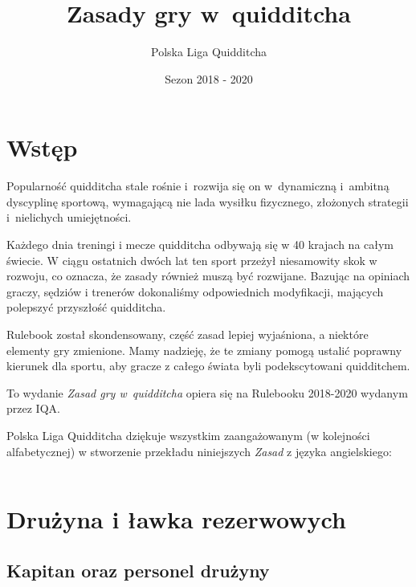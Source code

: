 \documentclass[11pt,a4paper]{article}
\title{Zasady gry w~quidditcha}
\author{Polska Liga Quidditcha}
\date{Sezon 2018 - 2020}
\newcommand{\psection}[1]{
  \section*{#1}
  \addcontentsline{toc}{section}{#1}
}
\newcommand\image[2]{
	\newgeometry{left=0cm,top=#2}
	\texttt{[image: \#1]}
	\restoregeometry
}
\begin{document}
\maketitle

\setlength{\parskip}{0ex}

\pagestyle{fancy}

\tableofcontents

\setlength{\parskip}{1ex plus 0.5ex minus 0.2ex}

\newpage

\psection{Wstęp}

Popularność quidditcha stale rośnie i~rozwija się on w~dynamiczną i~ambitną dyscyplinę sportową,
wymagającą nie lada wysiłku fizycznego,
złożonych strategii i~nielichych umiejętności.

Każdego dnia treningi i mecze quidditcha odbywają się w 40 krajach na całym świecie.
W ciągu ostatnich dwóch lat ten sport przeżył niesamowity skok w rozwoju, co oznacza,
że zasady również muszą być rozwijane. Bazując na opiniach graczy, sędziów i trenerów
dokonaliśmy odpowiednich modyfikacji, mających polepszyć przyszłość quidditcha.

Rulebook został skondensowany, część zasad lepiej wyjaśniona, a niektóre elementy gry
zmienione. Mamy nadzieję, że te zmiany pomogą ustalić poprawny kierunek dla sportu, aby gracze
z całego świata byli podekscytowani quidditchem.

To wydanie \emph{Zasad gry w~quidditcha} opiera się na Rulebooku 2018-2020 wydanym przez IQA.

Polska Liga Quidditcha dziękuje wszystkim zaangażowanym (w kolejności alfabetycznej) w stworzenie przekładu niniejszych \emph{Zasad} z języka angielskiego:
\begin{center}
	\begin{tabular}{c c}

	\end{tabular}
\end{center}

\pagebreak

\section{Drużyna i ławka rezerwowych}

\subsection{Kapitan oraz personel drużyny}
\end{document}
